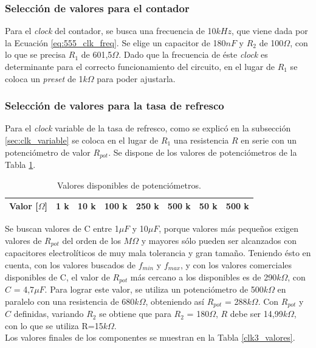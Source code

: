 \documentclass[11pt, a4paper]{article}
\begin{document}
\subsubsection{Selecci\'on de valores para el contador}
\noindent
Para el \textit{clock} del contador, se busca una frecuencia de 10$kHz$, que viene dada por la Ecuaci\'on \ref{eq:555_clk_freq}. Se elige un capacitor de 180$nF$ y $R_2$ de 100$\Omega$, con lo que se precisa $R_1$ de 601,5$\Omega$. Dado que la frecuencia de \'este \textit{clock} es determinante para el correcto funcionamiento del circuito, en el lugar de $R_1$ se coloca un \textit{preset} de 1$k\Omega$ para poder ajustarla. 
%
\subsubsection{Selecci\'on de valores para la tasa de refresco}
\noindent
Para el \textit{clock} variable de la tasa de refresco, como se explic\'o en la subsecci\'on \ref{sec:clk_variable}
se coloca en el lugar de $R_1$ una resistencia $R$ en serie con un potenci\'ometro de valor $R_{pot}$.
Se dispone de los valores de potenci\'ometros de la Tabla \ref{tab_pot_comerciales}.

\begin{table}[H]
\center
\begin{tabular}{|c|c|c|c|c|c|c|c|}
\hline
Valor [$\Omega$] & 1 k & 10 k & 100 k & 250 k & 500 k & 50 k & 500 k \\ \hline
\end{tabular}
\caption{Valores disponibles de potenci\'ometros.}
\label{tab_pot_comerciales}
\end{table}

\noindent
Se buscan valores de C entre 1$\mu F$ y 10$\mu F$, porque valores m\'as pequeños exigen valores de $R_{pot}$ del orden de los $M\Omega$ y mayores s\'olo pueden ser alcanzados con capacitores electrol\'iticos de muy mala tolerancia y gran tamaño. Teniendo \'esto en cuenta, con los valores buscados de $f_{min}$ y $f_{max}$, y con los valores comerciales disponibles de C, el valor de $R_{pot}$ m\'as cercano a los disponibles es de 290$k\Omega$, con $C$ = 4,7$\mu F$. Para lograr este valor, se utiliza un potenci\'ometro de 500$k\Omega $ en paralelo con una resistencia de $680k \Omega $, obteniendo as\'i $R_{pot}$ = 288$k\Omega $. Con $R_{pot}$ y $C$ definidas, variando $R_2$ se obtiene que para $R_2$ = 180$ \Omega $, $R$ debe ser 14,99$k\Omega$, con lo que se utiliza R=15$k \Omega $.\\
Los valores finales de los componentes se muestran en la Tabla \ref{clk3_valores}.
\end{document}
